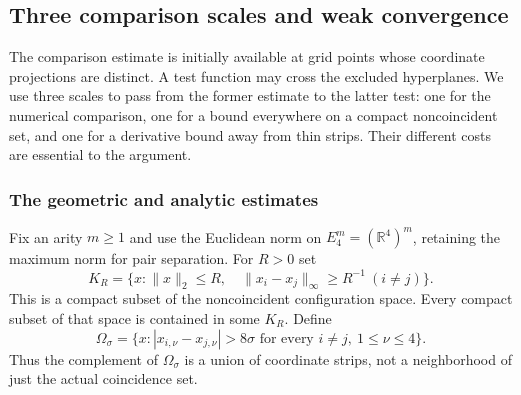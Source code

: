 \subsection{Three comparison scales and weak convergence}
\label{sec:three-panel-weak-comparison}

The comparison estimate is initially available at grid points whose coordinate
projections are distinct. A test function may cross the excluded hyperplanes.
We use three scales to pass from the former estimate to the latter test:
one for the numerical comparison, one for a bound everywhere on a compact
noncoincident set, and one for a derivative bound away from thin strips.
Their different costs are essential to the argument.

\subsubsection{The geometric and analytic estimates}

Fix an arity $m\ge1$ and use the Euclidean norm on
$E_4^m=(\mathbb R^4)^m$, retaining the maximum norm for pair separation. For $R>0$ set
\[
 K_R=\{x:\|x\|_2\le R,\quad
               \|x_i-x_j\|_\infty\ge R^{-1}\ (i\ne j)\}.
\]
This is a compact subset of the noncoincident configuration space. Every
compact subset of that space is contained in some $K_R$. Define
\[
 \Omega_\sigma=\{x: |x_{i,\nu}-x_{j,\nu}|>8\sigma
                  \text{ for every }i\ne j,\ 1\le\nu\le4\}.
\]
Thus the complement of $\Omega_\sigma$ is a union of coordinate strips,
not a neighborhood of just the actual coincidence set.

